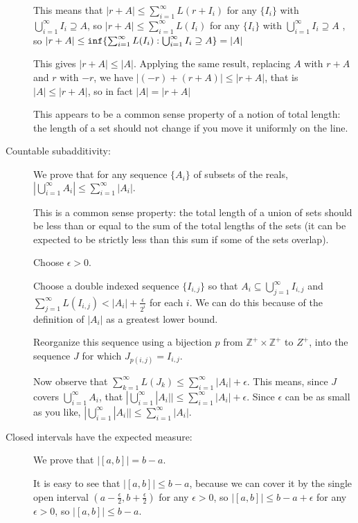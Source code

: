 \documentclass[12pt]{article}
\begin{document}
\begin{description}
This means that $|r+A| \leq \sum_{i=1}^{\infty} L(r+I_i)$ for any $\{I_i\}$ with $\bigcup_{i=1}^{\infty} I_i \supseteq A$, so $|r+A| \leq \sum_{i=1}^{\infty}L(I_i)$ for any $\{I_i\}$ with $\bigcup_{i=1}^{\infty} I_i \supseteq A$ , so $|r+A| \leq {\tt inf}\{\sum_{i=1}^{\infty} L(I_i): \bigcup_{i=1}^{\infty} I_i \supseteq A\} = |A|$

This gives $|r+A| \leq |A|$.  Applying the same result, replacing $A$ with $r+A$ and $r$ with $-r$, we have $|(-r)+(r+A)|\leq |r+A|$, that is $|A| \leq |r+A|$, so in fact
$|A|=|r+A|$

This appears to be a common sense property of a notion of total length:  the length of a set should not change if you move it uniformly on the line.

\item[Countable subadditivity:]  We prove that for any sequence $\{A_i\}$ of subsets of the reals, $|\bigcup_{i=1}^\infty A_i| \leq \sum_{i=1}^\infty |A_i|.$

This is a common sense property:  the total length of a union of sets should be less than or equal to the sum of the total lengths of the sets (it can be expected to be strictly
less than this sum if some of the sets overlap).

Choose $\epsilon>0$.

Choose a double indexed sequence $\{I_{i,j}\}$ so that $A_i \subseteq \bigcup_{j=1}^\infty I_{i,j}$  and $\sum_{j=1}^\infty L(I_{i,j})<|A_i|+\frac\epsilon{2^i}$ for each $i$.  We can do this because of the definition of $|A_i|$ as a greatest lower bound.

Reorganize this sequence using a bijection $p$ from $\mathbb Z^+ \times \mathbb Z^+$ to $Z^+$,  into the sequence $J$ for which $J_{p(i,j)} = I_{i,j}$. 

Now observe that $\sum_{k=1}^\infty L(J_k) \leq \sum_{i=1}^\infty |A_i|+\epsilon$.  This means, since $J$ covers $\bigcup_{i=1}^\infty A_i$, that
$|\bigcup_{i=1}^\infty |A_i|| \leq \sum_{i=1}^\infty |A_i|+\epsilon$.  Since $\epsilon$ can be as small as you like, $|\bigcup_{i=1}^\infty |A_i|| \leq \sum_{i=1}^\infty |A_i|$.

\item[Closed intervals have the expected measure:]  We prove that $|[a,b]|=b-a$.

It is easy to see that $|[a,b]| \leq b-a$, because we can cover it by the single open interval $(a-\frac\epsilon2,b+\frac\epsilon2)$ for any $\epsilon>0$, so
$|[a,b]|\leq b-a+\epsilon$ for any $\epsilon>0$, so $|[a,b]|\leq b-a$.


\end{description}
\end{document}
